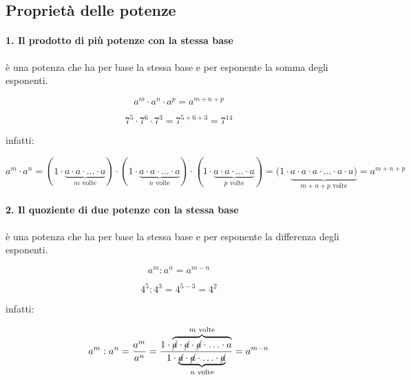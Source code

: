
\newcommand{\triaffiancati}[6]{
  \noindent
  \begin{minipage}[b]{#1\textwidth}
  #4
  \end{minipage}
  \hfill
  \begin{minipage}[b]{#2\textwidth}
  #5
  \end{minipage}
  \hfill
  \begin{minipage}[b]{#3\textwidth}
  #6
  \end{minipage}
}

\subsection{Proprietà delle potenze}

\paragraph{1. Il prodotto di più potenze con la stessa base} 
è una potenza che ha per base la stessa base e per esponente la somma 
degli esponenti.

\triaffiancati{.40}{.40}{.15}{
\[\boxed{a^m \cdot a^n \cdot a^p = a^{m+n+p}}\]
}{
\[7^5 \cdot 7^6 \cdot 7^3 = 7^{5 + 6 + 3} = 7^{14}\]
}{
infatti:
}
\[a^m \cdot a^n = 
  (1 \cdot \underbrace{a \cdot a \cdot \ldots \cdot a}_{m \text{ volte}}) 
\cdot 
  (1 \cdot \underbrace{a \cdot a \cdot \ldots \cdot a}_{n \text{ volte}}) 
\cdot 
  (1 \cdot \underbrace{a \cdot a \cdot \ldots \cdot a}_{p \text{ volte}}) =
  (1 \cdot \underbrace{a \cdot a \cdot a \cdot \ldots \cdot a 
  \cdot a)}_{m+n+p\text{ volte}} = a^{m+n+p}\]

\vspace{-1.5em}
\paragraph{2. Il quoziente di due potenze con la stessa base} 
è una potenza che ha per base la stessa base e per esponente la differenza 
degli esponenti.

\triaffiancati{.40}{.40}{.15}{
\[\boxed{a^m : a^n = a^{m-n}}\]
}{
\[4^5 : 4^3 = 4^{5 - 3} = 4^2\]
}{
infatti:
}
\[
 a^m: a^n = \frac{a^m}{a^n}=
 \frac{1 \cdot \overbrace{\cancel{a} \cdot \cancel{a} \cdot \cancel{a} \cdot 
                  \ldots \cdot a}^{m \text{ volte}}}
 {1 \cdot \underbrace{\cancel{a} \cdot \cancel{a} \cdot
                  \ldots \cdot \cancel{a}}_{n \text{ volte}}}=
 a^{m-n}
\]

